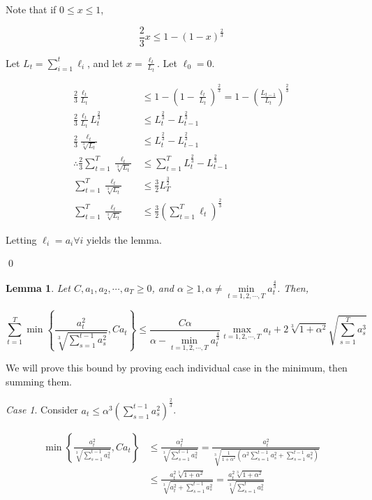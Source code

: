 \documentclass{article}
\newtheorem{lemma}[theorem]{Lemma}
\begin{document}
\proof Note that if $0 \leq x \leq 1$, 

\[
  \frac{2}{3} x \leq 1 - (1 - x)^\frac{2}{3}
\]

Let $L_t = \sum\limits_{i=1}^t \ell_i$, and let $x = \frac{\ell_t}{L_t}$. Let $\ell_0 = 0$.

\begin{align*}
  \frac{2}{3} \frac{\ell_t}{L_t}
  &\leq 1 - (1 - \frac{\ell_t}{L_t})^\frac{2}{3} = 1 - (\frac{L_{t-1}}{L_t})^\frac{2}{3} \\
  \frac{2}{3} \frac{\ell_t}{L_t} L_{t}^\frac{2}{3} &\leq L_{t}^\frac{2}{3} - L_{t-1}^\frac{2}{3} \\
  \frac{2}{3} \frac{\ell_t}{\sqrt[3]{L_t}} &\leq L_{t}^\frac{2}{3} - L_{t-1}^\frac{2}{3} \\
  \therefore \frac{2}{3} \sum\limits_{t=1}^T \frac{\ell_t}{\sqrt[3]{L_t}} &\leq \sum\limits_{t=1}^T L_{t}^\frac{2}{3} -
  L_{t-1}^\frac{2}{3} \\
  \sum\limits_{t=1}^T \frac{\ell_t}{\sqrt[3]{L_t}} &\leq \frac{3}{2} L_{T}^\frac{3}{2} \\
  \sum\limits_{t=1}^T \frac{\ell_t}{\sqrt[3]{L_t}} &\leq \frac{3}{2} \left(\sum\limits_{t=1}^T \ell_t \right)^\frac{2}{3}
\end{align*}

Letting $\ell_i = a_i \forall i$ yields the lemma.

\qed

\begin{lemma} \label{lemma:3}
  Let $C, a_1, a_2, \cdots, a_T \geq 0$, and $\alpha \geq 1, \alpha \neq \min\limits_{t=1,2,\cdots,T}a_{t}^\frac{4}{3}$.
  Then,

  \[
    \sum\limits_{t=1}^T \min \left\{ \frac{a_{t}^2}{\sqrt[3]{\sum\limits_{s=1}^{t-1} a_{s}^2}}, C a_t\right\} \leq
    \frac{C \alpha}{\alpha - \min\limits_{t=1,2,\cdots,T}a_{t}^\frac{4}{3}} \max\limits_{t=1,2,\cdots,T} a_t
    + 2\sqrt[3]{1 + \alpha^2} \sqrt{\sum\limits_{s=1}^T a_{s}^3}
  \]
\end{lemma}

\proof We will prove this bound by proving each individual case in the minimum, then summing them.

\emph{Case 1}. Consider $a_t \leq \alpha^3 \left(\sum\limits_{s=1}^{t-1} a_s^2\right)^\frac{2}{3}$.

\begin{align*}
  \min \left\{ \frac{a_{t}^2}{\sqrt[3]{\sum\limits_{s=1}^{t-1} a_{s}^2}}, C a_t \right\} 
  &\leq \frac{\alpha_{t}^2}{\sqrt[3]{\sum\limits_{s=1}^{t-1}a_{s}^2}} =
  \frac{a_{t}^2}{\sqrt[3]{\frac{1}{1+\alpha^2}\left(\alpha^2 \sum\limits_{s=1}^{t-1} a_{s}^2 +
  \sum\limits_{s=1}^{t-1} a_{s}^2 \right)}} \\
  &\leq \frac{a_{t}^2 \sqrt[3]{1 + \alpha^2}}{\sqrt[3]{a_{t}^2 + \sum\limits_{s=1}^{t-1} a_{s}^2}} = \frac{a_{t}^2
  \sqrt[3]{1 + \alpha^2}}{\sqrt[3]{\sum\limits_{s=1}^t a_{s}^2}}
\end{align*}
\end{document}
